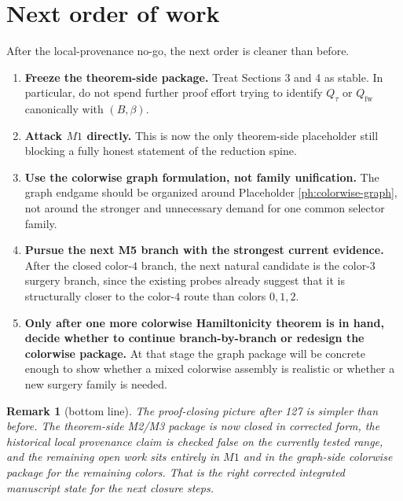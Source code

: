 \documentclass[11pt]{article}
\newtheorem{remark}[theorem]{Remark}
\begin{document}
\section{Next order of work}

After the local-provenance no-go, the next order is cleaner than before.

\begin{enumerate}[label=\textup{(\arabic*)},leftmargin=2.7em]
\item \textbf{Freeze the theorem-side package.}
      Treat Sections 3 and 4 as stable.
      In particular, do not spend further proof effort trying to identify
      $Q_{\tau}$ or $Q_{\mathrm{fw}}$ canonically with $(B,\beta)$.

\item \textbf{Attack $M1$ directly.}
      This is now the only theorem-side placeholder still blocking a fully
      honest statement of the reduction spine.

\item \textbf{Use the colorwise graph formulation, not family unification.}
      The graph endgame should be organized around Placeholder
      \ref{ph:colorwise-graph}, not around the stronger and unnecessary demand
      for one common selector family.

\item \textbf{Pursue the next M5 branch with the strongest current evidence.}
      After the closed color-$4$ branch, the next natural candidate is the
      color-$3$ surgery branch, since the existing probes already suggest that
      it is structurally closer to the color-$4$ route than colors $0,1,2$.

\item \textbf{Only after one more colorwise Hamiltonicity theorem is in hand,
      decide whether to continue branch-by-branch or redesign the colorwise
      package.}
      At that stage the graph package will be concrete enough to show whether a
      mixed colorwise assembly is realistic or whether a new surgery family is
      needed.
\end{enumerate}

\begin{remark}[bottom line]
The proof-closing picture after 127 is simpler than before.
The theorem-side M2/M3 package is now closed in corrected form, the historical
local provenance claim is checked false on the currently tested range, and the
remaining open work sits entirely in $M1$ and in the graph-side colorwise
package for the remaining colors.
That is the right corrected integrated manuscript state for the next closure
steps.
\end{remark}
\end{document}
